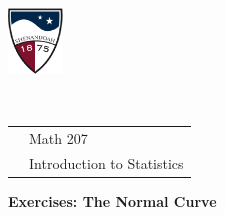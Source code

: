 \documentclass[10pt]{article}
\begin{document}
\pagestyle{empty}
\lstset{language=R, showspaces=false, showstringspaces=false}

\href{http://www.su.edu}{\includegraphics[height=1.75cm]{sulogo.eps}}
\vspace{-1.69cm}

{{\ }\hfill\small
\begin{tabular}{cl}
& Math 207\\
& Introduction to Statistics\\
\end{tabular}
}
\setlength{\baselineskip}{1.05\baselineskip}

\begin{center}
\textbf{\large  Exercises:  The Normal Curve}
\end{center}
\newcommand{\Z}{\hphantom{0}}
\end{document}
